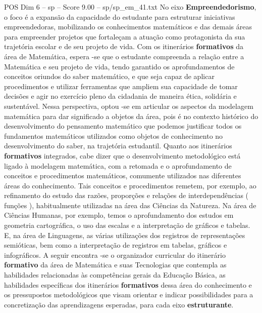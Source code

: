 \begin{textsample}{POS Dim 6 – sp – Score 9.00 – sp/sp\_em\_41.txt}
No eixo \textbf{Empreendedorismo}, o foco é a expansão da capacidade do estudante para estruturar iniciativas empreendedoras, mobilizando os conhecimentos matemáticos e das demais áreas para empreender projetos que fortaleçam a atuação como protagonista da sua trajetória escolar e de seu projeto de vida.
Com os itinerários \textbf{formativos} da área de Matemática, espera -se que o estudante compreenda a relação entre a Matemática e seu projeto de vida, tendo garantido os aprofundamentos de conceitos oriundos do saber matemático, e que seja capaz de aplicar procedimentos e utilizar ferramentas que ampliem sua capacidade de tomar decisões e agir no exercício pleno da cidadania de maneira ética, solidária e sustentável.
Nessa perspectiva, optou -se em articular os aspectos da modelagem matemática para dar significado a objetos da área, pois é no contexto histórico do desenvolvimento do pensamento matemático que podemos justificar todos os fundamentos matemáticos utilizados como objetos de conhecimento no desenvolvimento do saber, na trajetória estudantil.
Quanto aos itinerários \textbf{formativos} integrados, cabe dizer que o desenvolvimento metodológico está ligado à modelagem matemática, com a retomada e o aprofundamento de conceitos e procedimentos matemáticos, comumente utilizados nas diferentes áreas do conhecimento.
Tais conceitos e procedimentos remetem, por exemplo, ao refinamento do estudo das razões, proporções e relações de interdependências ( funções ), habitualmente utilizadas na área das Ciências da Natureza.
Na área de Ciências Humanas, por exemplo, temos o aprofundamento dos estudos em geometria cartográfica, o uso das escalas e a interpretação de gráficos e tabelas.
E, na área de Linguagens, as várias utilizações dos registros de representações semióticas, bem como a interpretação de registros em tabelas, gráficos e infográficos.
A seguir encontra -se o organizador curricular do itinerário \textbf{formativo} da área de Matemática e suas Tecnologias que contempla as habilidades relacionadas às competências gerais da Educação Básica, as habilidades específicas dos itinerários \textbf{formativos} dessa área do conhecimento e os pressupostos metodológicos que visam orientar e indicar possibilidades para a concretização das aprendizagens esperadas, para cada eixo \textbf{estruturante}.

\end{textsample}
